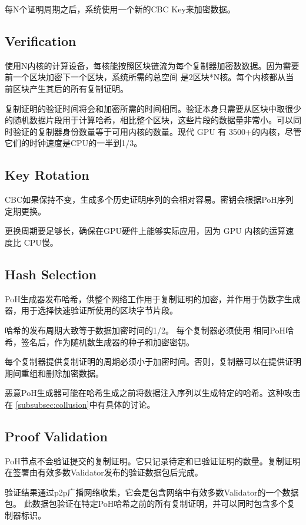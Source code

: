 \documentclass[12pt, uft8]{ctexart}
\begin{document}
每N个证明周期之后，系统使用一个新的CBC Key来加密数据。
\subsection{Verification}

使用N内核的计算设备，每核能按照区块链流为每个复制器加密数数据。因为需要前一个区块加密下一个区块，系统所需的总空间 是2区块*N核。每个内核都从当前区块产生其后的所有复制证明。

复制证明的验证时间将会和加密所需的时间相同。验证本身只需要从区块中取很少的随机数据片段用于计算哈希，相比整个区块，这些片段的数据量非常小。可以同时验证的复制器身份数量等于可用内核的数量。现代 GPU 有 3500+的内核，尽管它们的时钟速度是CPU的一半到1/3。 

\subsection{Key Rotation}

CBC如果保持不变，生成多个历史证明序列的会相对容易。密钥会根据PoH序列定期更换。

更换周期要足够长，确保在GPU硬件上能够实际应用，因为 GPU 内核的运算速度比 CPU慢。

\subsection{Hash Selection}\label{hashselection}

PoH生成器发布哈希，供整个网络工作用于复制证明的加密，并作用于伪数字生成器，用于选择快速验证所使用的区块字节片段。    

哈希的发布周期大致等于数据加密时间的1/2。 每个复制器必须使用 相同PoH哈希，签名后，作为随机数生成器的种子和加密密钥。

每个复制器提供复制证明的周期必须小于加密时间。否则，复制器可以在提供证明期间重组和删除加密数据。

恶意PoH生成器可能在哈希生成之前将数据注入序列以生成特定的哈希。这种攻击在 \ref{subsubsec:collusion}中有具体的讨论。

\subsection{Proof Validation}
PoH节点不会验证提交的复制证明。它只记录待定和已验证证明的数量。复制证明在签署由有效多数Validator发布的验证数据包后完成。 

验证结果通过p2p广播网络收集，它会是包含网络中有效多数Validator的一个数据包。 此数据包验证在特定PoH哈希之前的所有复制证明，并可以同时包含多个复制器标识。
\end{document}
